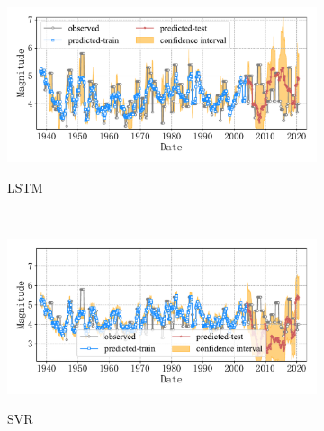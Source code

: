 \begin{figure}[!htbp]
  \centering
  \begin{subfigure}[b]{0.45\textwidth}
    \caption{LSTM}
    \vspace{-0.2cm}
    \includegraphics[width=\textwidth]{Img/chap5_seism/block6/seism_lstm_minyear_1932_maxyear_2021_spanlat_2_spanlon_4_timewindow_72_nextmonth_12_minmag_3.0_block_6.pdf}
    \vspace{-1cm}
    \label{fig:seism_lstm_minyear_1932_maxyear_2021_spanlat_2_spanlon_4_timewindow_72_nextmonth_12_minmag_3.0_block_6}
  \end{subfigure}
  ~
  \begin{subfigure}[b]{0.45\textwidth}
    \caption{SVR} 
    \vspace{-0.2cm}
    \includegraphics[width=\textwidth]{Img/chap5_seism/block6/seism_svr_minyear_1932_maxyear_2021_spanlat_2_spanlon_4_timewindow_72_nextmonth_12_minmag_3.0_block_6.pdf}
    \vspace{-1cm}
    \label{fig:seism_svr_minyear_1932_maxyear_2021_spanlat_2_spanlon_4_timewindow_72_nextmonth_12_minmag_3.0_block_6}
  \end{subfigure}   
  \\
  \begin{subfigure}[b]{0.45\textwidth}

\end{subfigure}
\end{figure}
